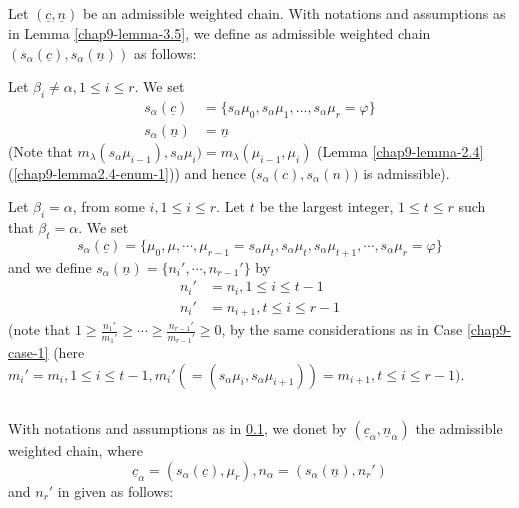 \setcounter{subsection}{5}
\subsection{}\label{chap9-subsec-3.6}
\pageoriginale

Let $(\underline{c}, \underline{n})$ be an admissible weighted chain. With notations and assumptions as in
Lemma \ref{chap9-lemma-3.5}, we define as admissible weighted chain $(s_{\alpha}(\underline{c}), s_{\alpha}(\underline{n}))$ as follows:

\begin{case}\label{chap9-subsec3.6-case-1}
Let $\beta_{i}\neq \alpha, 1 \leq i \leq r$. We set
\begin{align*}
s_{\alpha}(\underline{c}) &= \{s_{\alpha}\mu_{0}, s_{\alpha}\mu_{1}, \ldots, s_{\alpha}\mu_{r} = {\varphi}\}\\
s_{\alpha}(\underline{n}) &= \underline{n}
\end{align*}
(Note that $m_{\lambda}(s_{\alpha}\mu_{i-1}), s_{\alpha}\mu_{i}) = m_{\lambda}(\mu_{i-1}, \mu_{i})$
(Lemma \ref{chap9-lemma-2.4} (\ref{chap9-lemma2.4-enum-1})) and hence ($s_{\alpha}(c), s_{\alpha}(n))$ is admissible). 
\end{case}

\begin{case}\label{chap9-subsec3.6-case-2}
Let $\beta_{i}= \alpha$, from some $i, 1\leq i \leq r$. Let $t$ be the largest integer, $1 \leq t \leq r$ such that $\beta_{t} = \alpha$. We set
$$
s_{\alpha}(\underline{c}) = \{ \mu_{0}, \mu, \cdots, \mu_{r-1} = s_{\alpha}\mu_{t}, s_{\alpha}\mu_{t}, s_{\alpha}\mu_{t+1}, \cdots, s_{\alpha}\mu_{r} = \varphi\}
$$
and we define $s_{\alpha}(\underline{n}) = \{n_{i}', \cdots, n_{r-1}'\}$ by
\begin{align*}
n_{i}' &= n_{i}, 1\leq i \leq t-1\\
n_{i}' &= n_{i+1}, t\leq i\leq r-1
\end{align*}
(note that $1 \geq \frac{n_{1}'}{m_{1}'} \geq \cdots \geq \frac{n_{r-1}'}{m_{r-1}'} \geq 0$, by the same considerations as in Case \ref{chap9-case-1} (here $m_{i}' =m_{i}, 1 \leq i \leq t-1, m_{i}'(=(s_{\alpha}\mu_{i}, s_{\alpha}\mu_{i+1}))=m_{i+1}, t \leq i \leq r-1)$.
\end{case}

\subsection{}\label{chap9-subsec-3.7}
With notations and assumptions as in \ref{chap9-subsec-3.6}, we donet by $(\underline{c}_{\alpha}, \underline{n}_{\alpha})$ the admissible weighted chain, where
$$
\underline{c}_{\alpha} = (s_{\alpha}(\underline{c}), \mu_{r}), n_{\alpha} = (s_{\alpha}(\underline{n}), n_{r}')
$$
and $n_{r}'$ in given as follows:

